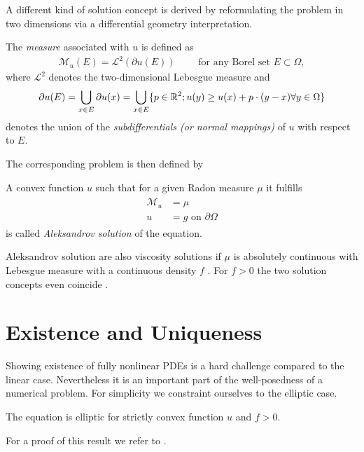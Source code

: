 A different kind of solution concept is derived by reformulating the \MA problem in two dimensions via a differential geometry interpretation.

\begin{definition}\label{def:MA measure}
	The \emph{\MA measure} associated with $u$ is defined as 
	\begin{align}
		\mathcal{M}_u (E) = \mathcal{L}^2(\partial u(E)) \qquad \text{ for any Borel set } E \subset \Omega,
	\end{align}
	where $\mathcal{L}^2$ denotes the two-dimensional Lebesgue measure and 
	\[
		\partial u(E) = \bigcup_{x \in E} \partial u (x) = \bigcup_{x \in E} \{p \in \mathbb{R}^2; u(y) \geq u(x) +p\cdot (y-x) \forall y \in \Omega\}
	\]
	denotes the union of the \emph{subdifferentials (or normal mappings)} of $u$ with respect to $E$.
\end{definition}
The corresponding \MA problem is then defined by

\begin{definition}\label{def:aleksandrov solution}
A convex function $u$ such that for a given Radon measure $\mu$ it fulfills
\begin{align}
\begin{split}
\mathcal M_u&= \mu \\ 
u &= g  \text{ on } \partial \Omega
\end{split}
\end{align}
is called \emph{Aleksandrov solution} of the \MA equation.
\end{definition}

Aleksandrov solution are also viscosity solutions if $\mu$ is absolutely continuous with Lebesgue measure with a continuous density $f$ \cite[proposition 1.3.4.]{Gutierrez2001} . For $f > 0$ the two solution concepts even coincide \cite[proposition 1.7.1]{Gutierrez2001}. 

\section{Existence and Uniqueness}
Showing existence of fully nonlinear PDEs is a hard challenge compared to the linear case. Nevertheless it is an important part of the well-posedness of a numerical problem. 
For simplicity we constraint ourselves to the elliptic case. 
\begin{proposition}
	The \MA equation is elliptic for strictly convex function $u$ and $f > 0$.
\end{proposition}
For a proof of this result we refer to \cite{CC1995, GT1977}. 

